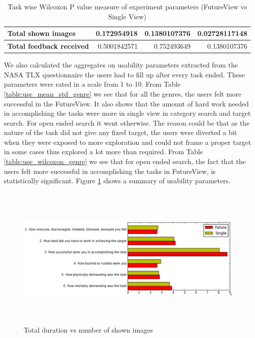 \documentclass[english]{tktltiki}
\begin{document}
\begin{table}
\begin{center}
\begin{tabular}{|l|r|r|r|}
        \multicolumn{1}{|l|}{\textbf{Total shown images}} & 0.172954918 & 0.1380107376 & 0.02728117148 \\
        \hline
        
        \multicolumn{1}{|l|}{\textbf{Total feedback received}} & 0.5001842571 & 0.752493649 & 0.1380107376 \\
        \hline
        
    \end{tabular}
	\end{center}
	\caption{Task wise Wilcoxon P value measure of experiment parameters (FutureView vs Single View)}
    \label{table:exp_wilcox_task}
\end{table}

We also calculated the aggregates on usability parameters extracted from the NASA  TLX questionnaire the users had to fill up after every task ended. These parameters were rated in a scale from 1 to 10. From Table \ref{table:use_mean_std_genre} we see that for all the genres, the users felt more successful in the FutureView. It also shows that the amount of hard work needed in accomplishing the tasks were more in single view in category search and target search. For open ended search it went otherwise. The reason could be that as the nature of the task did not give any fixed target, the users were diverted a bit when they were exposed to more exploration and could not frame a proper target in some cases thus explored a lot more than required. From Table \ref{table:use_wilcoxon_genre} we see that for open ended search, the fact that the users felt more successful in accomplishing the tasks in FutureView, is statistically significant. Figure \ref{fig:bar_chart_NASA_TLX} shows a summary of usability parameters.


\begin{figure}[h!]
  \centering
    \includegraphics[width=1.0\textwidth,height=7cm]{figures/Bar_chart_usability_parameters_numbered.png}
    \caption{Total duration vs number of shown images}
    \label{fig:bar_chart_NASA_TLX}
\end{figure}
\end{document}
